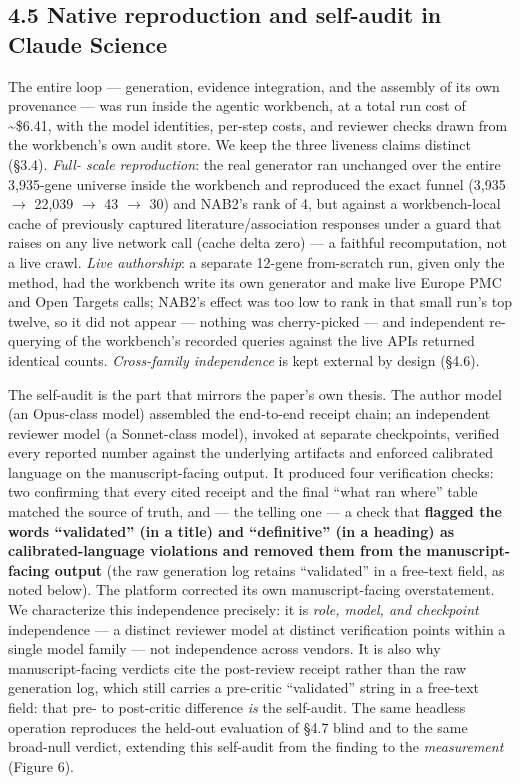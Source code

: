 \subsection*{4.5 Native reproduction and self-audit in Claude Science}\label{native-reproduction-and-self-audit-in-claude-science}

The entire loop --- generation, evidence integration, and the assembly of its own provenance --- was run inside the
agentic workbench, at a total run cost of \textasciitilde\$6.41, with the model identities, per-step costs, and reviewer
checks drawn from the workbench's own audit store. We keep the three liveness claims distinct (\S{}3.4). \emph{Full-
scale reproduction}: the real generator ran unchanged over the entire 3,935-gene universe inside the
workbench and reproduced the exact funnel (3,935 $\rightarrow$ 22,039 $\rightarrow$ 43 $\rightarrow$ 30) and NAB2's rank of 4, but against a
workbench-local cache of previously captured literature/association responses under a guard that raises on
any live network call (cache delta zero) --- a faithful recomputation, not a live crawl. \emph{Live authorship}: a
separate 12-gene from-scratch run, given only the method, had the workbench write its own generator and make
live Europe PMC and Open Targets calls; NAB2's effect was too low to rank in that small run's top twelve, so
it did not appear --- nothing was cherry-picked --- and independent re-querying of the workbench's recorded
queries against the live APIs returned identical counts. \emph{Cross-family independence} is kept external by
design (\S{}4.6).

The self-audit is the part that mirrors the paper's own thesis. The author model (an Opus-class
model) assembled the end-to-end receipt chain; an independent reviewer model (a Sonnet-class model),
invoked at separate checkpoints, verified every reported number against the underlying artifacts and
enforced calibrated language on the manuscript-facing output. It produced four verification checks: two
confirming that every cited receipt and the final ``what ran where'' table matched the source of truth, and ---
the telling one --- a check that \textbf{flagged the words ``validated'' (in a title) and ``definitive'' (in a heading)
as calibrated-language violations and removed them from the manuscript-facing output} (the raw generation log
retains ``validated'' in a free-text field, as noted below). The platform corrected its own manuscript-facing
overstatement. We characterize this independence precisely: it is \emph{role, model, and checkpoint} independence
--- a distinct reviewer model at distinct verification points within a single model family --- not independence
across vendors. It is also why manuscript-facing verdicts cite the post-review receipt rather than the raw
generation log, which still carries a pre-critic ``validated'' string in a free-text field: that pre- to
post-critic difference \emph{is} the self-audit. The same headless operation reproduces the held-out evaluation
of \S{}4.7 blind and to the same broad-null verdict, extending this self-audit from the finding to the
\emph{measurement} (Figure 6).

